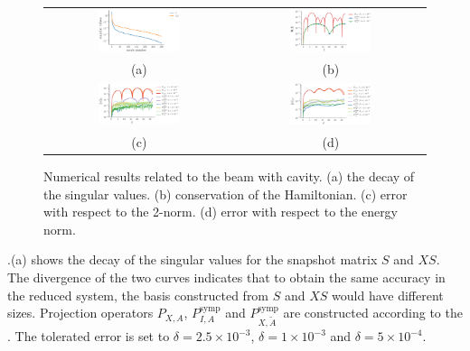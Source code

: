 \begin{figure} 
\begin{tabular}{cc}
\includegraphics[width=0.45\textwidth]{./images/paper2/beam_cracked/singulars} & \includegraphics[width=0.45\textwidth]{./images/paper2/beam_cracked/energy} \\
(a) & (b) \\
\includegraphics[width=0.45\textwidth]{./images/paper2/beam_cracked/l2} & \includegraphics[width=0.45\textwidth]{./images/paper2/beam_cracked/energy_norm} \\
(c) & (d) \\
\end{tabular}
\caption{Numerical results related to the beam with cavity. (a) the decay of the singular values. (b) conservation of the Hamiltonian. (c) error with respect to the 2-norm. (d) error with respect to the energy norm.} \label{fig:1.1}
\end{figure}

.(a) shows the decay of the singular values for the snapshot matrix $S$ and $XS$. The divergence of the two curves indicates that to obtain the same accuracy in the reduced system, the basis constructed from $S$ and $XS$ would have different sizes.
Projection operators $P_{X,A}$, $P_{I,A}^{\text{symp}}$ and $P_{X,\tilde A}^{\text{symp}}$ are constructed according to the . The tolerated error is set to $\delta = 2.5\times 10^{-3}$, 
$\delta = 1\times 10^{-3}$ and $\delta = 5\times 10^{-4}$.

